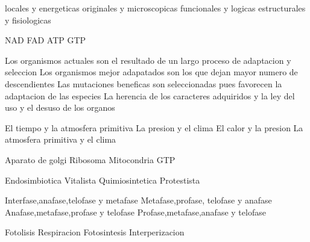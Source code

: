 \documentclass[10pt,a4paper]{article}
\begin{document}
	\BgThispage
	\datosalu
		
	\begin{multicols*}{2}
	
				{locales y energeticas}
				{originales y microscopicas}
				{funcionales y logicas}
				{estructurales y fisiologicas}
				
	
				{NAD}
				{FAD}
				{ATP}
				{GTP}
				
				{Los organismos actuales son el resultado de un largo proceso de adaptacion y seleccion}
				{Los organismos mejor adapatados son los que dejan mayor numero de descendientes}
				{Las mutaciones beneficas son seleccionadas pues favorecen la adaptacion de las especies}
				{La herencia de los caracteres adquiridos y la ley del uso y el desuso de los organos}
				
				{El tiempo y la atmosfera primitiva}
				{La presion y el clima}
				{El calor y la presion}
				{La atmosfera primitiva y el clima}
				
				{Aparato de golgi}
				{Ribosoma}
				{Mitocondria}
				{GTP}

				{Endosimbiotica}
				{Vitalista}
				{Quimiosintetica}
				{Protestista}
	
				{Interfase,anafase,telofase y metafase}
				{Metafase,profase, telofase y anafase}
				{Anafase,metafase,profase y telofase}
				{Profase,metafase,anafase y telofase}
				
				{Fotolisis}
				{Respiracion}
				{Fotosintesis}
				{Interperizacion}
				

\end{multicols*}
\end{document}
